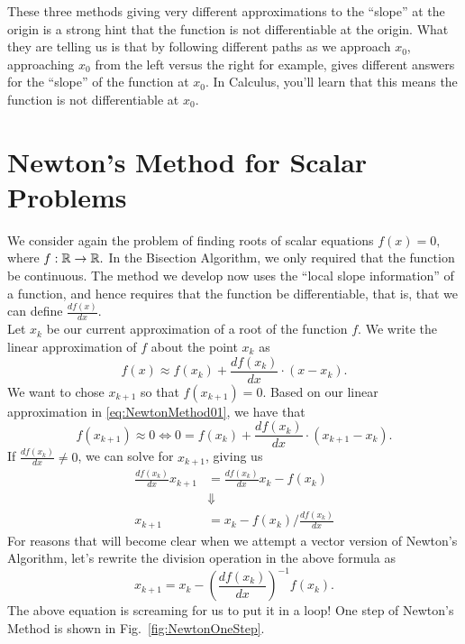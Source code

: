 These three methods giving very different approximations to the ``slope'' at the origin is a strong hint that the function is not differentiable at the origin. What they are telling us is that by following different paths as we approach $x_0$, approaching $x_0$ from the left versus the right for example, gives different answers for the ``slope'' of the function at $x_0$. In Calculus, you'll learn that this means the function is not differentiable at $x_0$.


\Qed


\vspace*{0.5cm}

\section{Newton's Method for Scalar Problems}
\label{sec:newtonMethod}

We consider again the problem of finding roots of scalar equations $f(x)=0,$
where $f:\mathbb R \to \mathbb R.$ In the Bisection Algorithm, we only required that the function be continuous. The method we develop now uses the ``local slope information'' of a function, and hence requires that the function be differentiable, that is, that we can define $\frac{df(x)}{dx}$.\\

Let $x_k$ be our current approximation of a root of the function $f$. We write the linear approximation of $f$ about the point $x_k$ as
\begin{equation}
    \label{eq:NewtonMethod01}
    f(x) \approx f(x_k) + \frac{df(x_k)}{dx}\cdot (x - x_k).
\end{equation}
We want to chose $x_{k+1}$ so that $f(x_{k+1})=0$. Based on our linear approximation in \eqref{eq:NewtonMethod01}, we have that 
$$ f(x_{k+1}) \approx 0 \iff  0 =  f(x_k) + \frac{df(x_k)}{dx}\cdot (x_{k+1} - x_k).$$
If $\frac{df(x_k)}{dx}\neq 0$, we can solve for $x_{k+1}$, giving us 
\begin{align*}
\frac{df(x_k)}{dx} x_{k+1}& =   \frac{df(x_k)}{dx} x_k -f(x_k)\\
& \Downarrow \\
     x_{k+1} &=x_{k} -    {f(x_k)}\Big/{\frac{df(x_k)}{dx} }
\end{align*} 
For reasons that will become clear when we attempt a vector version of Newton's Algorithm, let's rewrite the division operation in the above formula as
$$ \boxed{    x_{k+1}=x_{k} - \left(   \frac{df(x_k)}{dx}\right)^{-1} f(x_k).}$$
The above equation is screaming for us to put it in a loop! One step of Newton's Method is shown in Fig.~\ref{fig:NewtonOneStep}.


